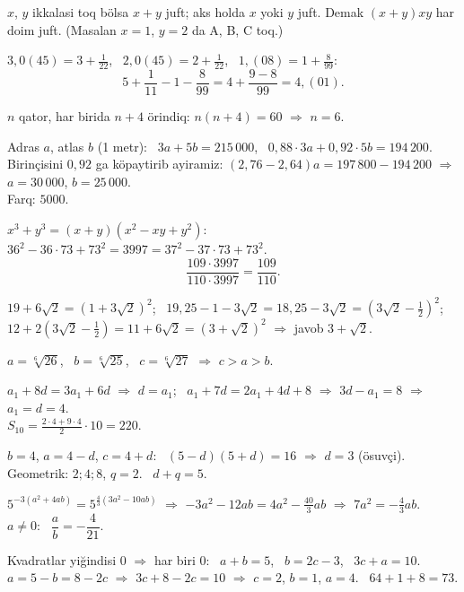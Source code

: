 




$x$, $y$ ikkalasi toq bölsa $x+y$ juft; aks holda $x$ yoki $y$ juft. Demak $(x+y)xy$ har doim juft. (Masalan $x=1$, $y=2$ da A, B, C toq.)

$3{,}0(45)=3+\frac1{22}$, \ $2{,}0(45)=2+\frac1{22}$, \ $1{,}(08)=1+\frac8{99}$:
\[5+\frac1{11}-1-\frac8{99}=4+\frac{9-8}{99}=4{,}(01).\]

$n$ qator, har birida $n+4$ örindiq: $n(n+4)=60$ $\Rightarrow$ $n=6$.

Adras $a$, atlas $b$ (1 metr): \ $3a+5b=215\,000$, \ $0{,}88\cdot3a+0{,}92\cdot5b=194\,200$.\\
Birinçisini $0{,}92$ ga köpaytirib ayiramiz: $(2{,}76-2{,}64)a=197\,800-194\,200$ $\Rightarrow$ $a=30\,000$, $b=25\,000$.\\
Farq: $5000$.

$x^3+y^3=(x+y)(x^2-xy+y^2)$: \ $36^2-36\cdot73+73^2=3997=37^2-37\cdot73+73^2$.
\[\frac{109\cdot3997}{110\cdot3997}=\frac{109}{110}.\]

$19+6\sqrt2=\left(1+3\sqrt2\right)^2$; \ $19{,}25-1-3\sqrt2=18{,}25-3\sqrt2=\left(3\sqrt2-\frac12\right)^2$;\\
$12+2\left(3\sqrt2-\frac12\right)=11+6\sqrt2=\left(3+\sqrt2\right)^2$ $\Rightarrow$ javob $3+\sqrt2$.

$a=\sqrt[6]{26}$, \ $b=\sqrt[6]{25}$, \ $c=\sqrt[6]{27}$ $\Rightarrow$ $c>a>b$.

$a_1+8d=3a_1+6d$ $\Rightarrow$ $d=a_1$; \ $a_1+7d=2a_1+4d+8$ $\Rightarrow$ $3d-a_1=8$ $\Rightarrow$ $a_1=d=4$.\\
$S_{10}=\frac{2\cdot4+9\cdot4}2\cdot10=220$.

$b=4$, $a=4-d$, $c=4+d$: \ $(5-d)(5+d)=16$ $\Rightarrow$ $d=3$ (ösuvçi). Geometrik: $2;4;8$, $q=2$. \ $d+q=5$.

$5^{-3(a^2+4ab)}=5^{\frac43(3a^2-10ab)}$ $\Rightarrow$ $-3a^2-12ab=4a^2-\frac{40}3ab$ $\Rightarrow$ $7a^2=-\frac43ab$.\\
$a\ne0$: \ $\dfrac ab=-\dfrac4{21}$.

Kvadratlar yiğindisi $0$ $\Rightarrow$ har biri $0$: \ $a+b=5$, \ $b=2c-3$, \ $3c+a=10$.\\
$a=5-b=8-2c$ $\Rightarrow$ $3c+8-2c=10$ $\Rightarrow$ $c=2$, $b=1$, $a=4$. \ $64+1+8=73$.

